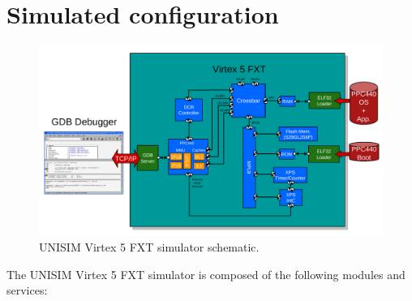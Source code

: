 \section{Simulated configuration}
\label{UNISIM Virtex 5 FXT_simulated_configuration}
\begin{figure}[!ht]
	\begin{center}
		\includegraphics[width=\textwidth]{virtex5fxt/fig_schematic.pdf}
	\end{center}
	\caption{UNISIM Virtex 5 FXT simulator schematic.}
\end{figure}
\noindent The UNISIM Virtex 5 FXT simulator is composed of the following modules and services:
